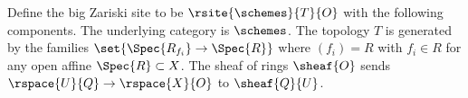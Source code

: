 \begin{definition}
Define the big Zariski site 
to be $\rsite{\schemes}{T}{O}$ with the following components.
The underlying category is $\schemes$.
The topology $T$ is generated by the families $\set{\Spec{R_{f_i}} \rightarrow \Spec{R}}$
where $(f_i) = R$ with $f_i\in R$ for any open affine $\Spec{R} \subset X$.
The sheaf of rings $\sheaf{O}$ sends $\rspace{U}{Q} \rightarrow \rspace{X}{O}$
to $\sheaf{Q}{U}$.
\end{definition}
